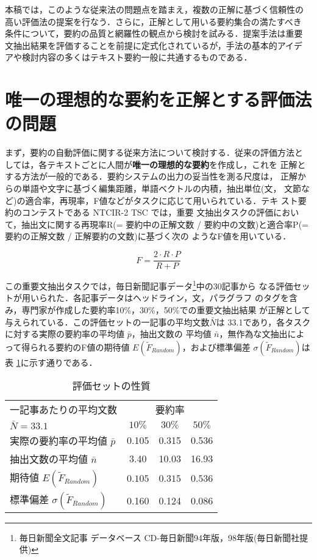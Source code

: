 本稿では，このような従来法の問題点を踏まえ，複数の正解に基づく信頼性の
高い評価法の提案を行なう．さらに，正解として用いる要約集合の満たすべき
条件について，要約の品質と網羅性の観点から検討を試みる．提案手法は重要
文抽出結果を評価することを前提に定式化されているが，手法の基本的アイデ
アや検討内容の多くはテキスト要約一般に共通するものである．


\section{唯一の理想的な要約を正解とする評価法の問題}

まず，要約の自動評価に関する従来方法について検討する．従来の評価方法と
しては，各テキストごとに人間が{\bf 唯一の理想的な要約}を作成し，これを
正解とする方法が一般的である．要約システムの出力の妥当性を測る尺度は，
正解からの単語や文字に基づく編集距離，単語ベクトルの内積，抽出単位(文，
文節など)の適合率，再現率，F値などがタスクに応じて用いられている．テキ
スト要約のコンテストである NTCIR-2 TSC \cite{T.Fukusima.01}では，重要
文抽出タスクの評価において，抽出文に関する再現率R(= 要約中の正解文数 / 
要約中の文数)と適合率P(= 要約の正解文数 / 正解要約の文数)に基づく次の
ようなF値を用いている．

\begin{equation}
F = \frac{2 \cdot R \cdot P}{R + P}
\end{equation}

この重要文抽出タスクでは，毎日新聞記事データ\footnote{毎日新聞全文記事
データベース CD-毎日新聞94年版，98年版(毎日新聞社提供)}中の30記事から
なる評価セットが用いられた．各記事データはヘッドライン，文，パラグラフ
のタグを含み，専門家が作成した要約率10\%，30\%，50\%での重要文抽出結果
が正解として与えられている．この評価セットの一記事の平均文数$\bar{N}$は
33.1であり，各タスクに対する実際の要約率の平均値 $\bar{p}$，抽出文数の
平均値 $\bar{n}$，無作為な文抽出によって得られる要約のF値の期待値 
$E(\tilde F_{Random})$，および標準偏差 $\sigma(\tilde F_{Random})$は表
\ref{table-np-test}に示す通りである．

\begin{table}
\begin{center}
\caption{評価セットの性質}
\begin{tabular}{|l||c|c|c|} \hline
一記事あたりの平均文数 & \multicolumn{3}{c|}{要約率} \\ \cline{2-4}
 $\bar{N} = 33.1$ & $10\%$ & $30\%$ & $50\%$ \\ \hline\hline
実際の要約率の平均値 $\bar{p}$ & 0.105 & 0.315 & 0.536 \\ \hline
抽出文数の平均値 $\bar{n}$ & 3.40 & 10.03 & 16.93 \\ \hline
期待値 $E(\tilde F_{Random})$ & $0.105$ & $0.315$ & $0.536$ \\ \hline
標準偏差 $\sigma(\tilde F_{Random})$ & 0.160 & 0.124 & 0.086 \\ \hline
\end{tabular}
\label{table-np-test}
\end{center}
\end{table}

